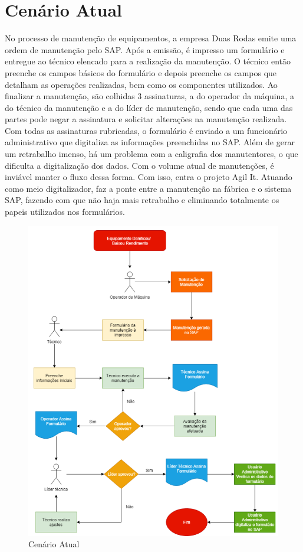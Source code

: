 \section{Cenário Atual}
No processo de manutenção de equipamentos, a empresa Duas Rodas emite uma ordem de manutenção pelo SAP. Após a emissão, é impresso um formulário e entregue ao técnico elencado para a realização da manutenção. O técnico então preenche os campos básicos do formulário e depois preenche os campos que detalham as operações realizadas, bem como os componentes utilizados. Ao finalizar a manutenção, são colhidas 3 assinaturas, a do operador da máquina, a do técnico da manutenção e a do líder de manutenção, sendo que cada uma das partes pode negar a assinatura e solicitar alterações na manutenção realizada. Com todas as assinaturas rubricadas, o formulário é enviado a um funcionário administrativo que digitaliza as informações preenchidas no SAP. Além de gerar um retrabalho imenso, há um problema com a caligrafia dos manutentores, o que dificulta a digitalização dos dados. Com o volume atual de manutenções, é inviável manter o fluxo dessa forma. Com isso, entra o projeto Agil It. Atuando como meio digitalizador, faz a ponte entre a manutenção na fábrica e o sistema SAP, fazendo com que não haja mais retrabalho e eliminando totalmente os papeis utilizados nos formulários.
\newpage
\begin{figure}[htb]
	\caption{\label{cenario_atual1}Cenário Atual}
	\begin{center}
		\includegraphics[scale=0.55]{./Figuras/cenario-atual1.png}
	\end{center}
\end{figure}

